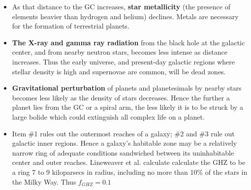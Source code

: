 \begin{frame}
\begin{itemize}
\item As that distance to the GC increases, {\bf star metallicity} (the presence of elements heavier than hydrogen and helium) declines. Metals are necessary for the formation of terrestrial planets.
\item {\bf The X-ray and gamma ray radiation} from the black hole at the galactic center, and from nearby neutron stars, becomes less intense as distance increases. Thus the early universe, and present-day galactic regions where stellar density is high and supernovae are common, will be dead zones.
\item{\bf Gravitational perturbation} of planets and planetesimals by nearby stars becomes less likely as the density of stars decreases. Hence the further a planet lies from the GC or a spiral arm, the less likely it is to be struck by a large bolide which could extinguish all complex life on a planet.
\end{itemize}

\begin{itemize}
\item Item \#1 rules out the outermost reaches of a galaxy; \#2 and \#3 rule out galactic inner regions. Hence a galaxy's habitable zone may be a relatively narrow ring of adequate conditions sandwiched between its uninhabitable center and outer reaches. Lineweaver et al. calculate calculate the GHZ to be a ring 7 to 9 kiloparsecs in radius, including no more than 10\% of the stars in the Milky Way. Thus $f_{GHZ} = 0.1$
\end{itemize}

\end{frame}

